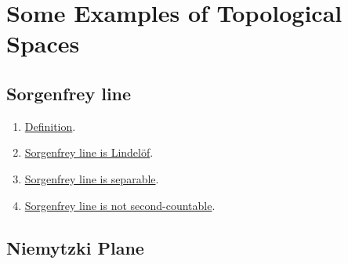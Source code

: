 \chapter{Some Examples of Topological Spaces}
\label{ch: some examples of topological spaces}




\section{Sorgenfrey line}
\label{sec: sorgenfrey line}


\begin{enumerate}
	\item \href{https://proofwiki.org/wiki/Definition:Sorgenfrey_Line}{Definition}.
	\item \href{https://proofwiki.org/wiki/Sorgenfrey_Line_is_Lindel%C3%B6f}{Sorgenfrey line is Lindel\"of}.
	\item \href{https://proofwiki.org/wiki/Sorgenfrey_Line_is_Separable}{Sorgenfrey line is separable}.
	\item \href{https://proofwiki.org/wiki/Sorgenfrey_Line_is_not_Second-Countable}{Sorgenfrey line is not second-countable}.
\end{enumerate}

\section{Niemytzki Plane}
\label{sec: niemytzki plane}
